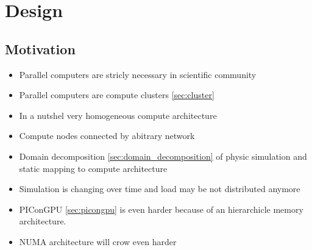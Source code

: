 \chapter{Design}
\label{sec:design}



\section{Motivation}
\begin{itemize}
\item Parallel computers are stricly necessary in scientific community
\item Parallel computers are compute clusters \ref{sec:cluster}
\item In a nutshel very homogeneous compute architecture
\item Compute nodes connected by abitrary network
\item Domain decomposition \ref{sec:domain_decomposition} of physic simulation 
and static mapping to compute architecture
\item Simulation is changing over time and load may be not distributed anymore
\item PIConGPU \ref{sec:picongpu} is even harder because of an hierarchicle
memory architecture. 
\item NUMA architecture will crow even harder
\end{itemize}

